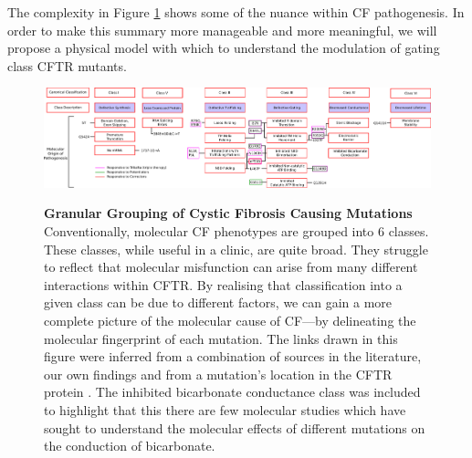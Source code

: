 The complexity in Figure \ref{granular_classification} shows some of the nuance within CF pathogenesis. In order to make this summary more manageable and more meaningful, we will propose a physical model with which to understand the modulation of gating class CFTR mutants. 

\begin{landscape}
\begin{figure}
	\begin{center}
	\includegraphics[width=1.5\textwidth]{figures/perspective/classes_mutations.pdf}\\
	\end{center}
	\captionsetup{singlelinecheck = false, justification=raggedright}
	\caption[Granular grouping of CF pathogenesis]{\textbf{Granular Grouping of Cystic Fibrosis Causing Mutations}{ Conventionally, molecular CF phenotypes are grouped into 6 classes. These classes, while useful in a clinic, are quite broad. They struggle to reflect that molecular misfunction can arise from many different interactions within CFTR. By realising that classification into a given class can be due to different factors, we can gain a more complete picture of the molecular cause of CF---by delineating the molecular fingerprint of each mutation. The links drawn in this figure were inferred from a combination of sources in the literature, our own findings and from a mutation's location in the CFTR protein \cite{bompadre2007, yeh2019a, gong2004, wong2022, vangoor2009, vangoor2014, hoffmann2018, thelin2007, gene2008, trikafta_website, phuan2018, ensinck2022}. The inhibited bicarbonate conductance class was included to highlight that this there are few molecular studies which have sought to understand the molecular effects of different mutations on the conduction of bicarbonate. }
	}

	\label{granular_classification}
\end{figure}
\end{landscape}


